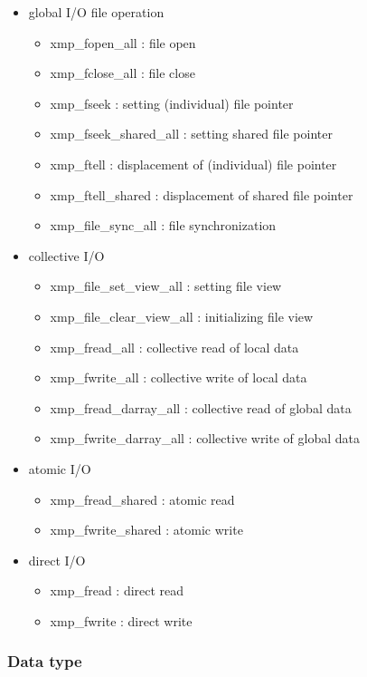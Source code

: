    \begin{itemize}
    \item global I/O file operation
    \begin{itemize}
     \item xmp\_fopen\_all : file open
     \item xmp\_fclose\_all : file close
     \item xmp\_fseek : setting (individual) file pointer
     \item xmp\_fseek\_shared\_all : setting shared file pointer
     \item xmp\_ftell : displacement of (individual) file pointer
     \item xmp\_ftell\_shared : displacement of shared file pointer
     \item xmp\_file\_sync\_all : file synchronization
    \end{itemize}
    \item collective I/O
    \begin{itemize}
     \item xmp\_file\_set\_view\_all : setting file view
     \item xmp\_file\_clear\_view\_all : initializing file view
     \item xmp\_fread\_all : collective read of local data
     \item xmp\_fwrite\_all : collective write of local data
     \item xmp\_fread\_darray\_all : collective read of global data
     \item xmp\_fwrite\_darray\_all : collective write of global data
    \end{itemize}
    \item atomic I/O
    \begin{itemize}
     \item xmp\_fread\_shared : atomic read
     \item xmp\_fwrite\_shared : atomic write
    \end{itemize}
    \item direct I/O
    \begin{itemize}
     \item xmp\_fread : direct read
     \item xmp\_fwrite : direct write
    \end{itemize}
   \end{itemize}

   \clearpage
   
   \subsubsection{Data type}

